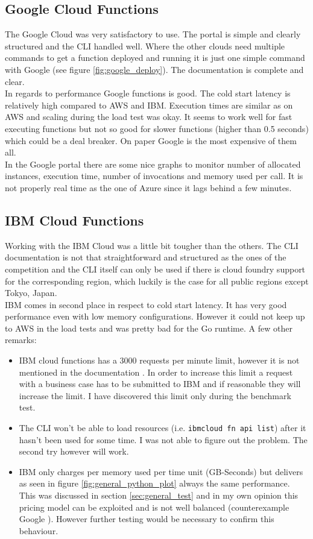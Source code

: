 \subsection*{Google Cloud Functions}
The Google Cloud was very satisfactory to use. The portal is simple and clearly structured and the \gls{CLI} handled well. Where the other clouds need multiple commands to get a function deployed and running it is just one simple command with Google (see figure \ref{fig:google_deploy}). The documentation is complete and clear.\\
In regards to performance Google functions is good. The cold start latency is relatively high compared to \gls{AWS} and \gls{IBM}. Execution times are similar as on \gls{AWS} and scaling during the load test was okay. It seems to work well for fast executing functions but not so good for slower functions (higher than 0.5 seconds) which could be a deal breaker. On paper Google is the most expensive of them all.\\
In the Google portal there are some nice graphs to monitor number of allocated instances, execution time, number of invocations and memory used per call. It is not properly real time as the one of Azure since it lags behind a few minutes.
\subsection*{IBM Cloud Functions}
Working with the \gls{IBM} Cloud was a little bit tougher than the others. The \gls{CLI} documentation is not that straightforward and structured as the ones of the competition and the \gls{CLI} itself can only be used if there is cloud foundry support for the corresponding region, which luckily is the case for all public regions except Tokyo, Japan.\\
\gls{IBM} comes in second place in respect to cold start latency. It has very good performance even with low memory configurations. However it could not keep up to \gls{AWS} in the load tests and was pretty bad for the Go runtime. A few other remarks:
\begin{itemize}
    \item \gls{IBM} cloud functions has a 3000 requests per minute limit, however it is not mentioned in the documentation \cite{IBMLimits}. In order to increase this limit a request with a business case has to be submitted to \gls{IBM} and if reasonable they will increase the limit. I have discovered this limit only during the benchmark test.
    \item The \gls{CLI} won't be able to load resources (i.e. \texttt{ibmcloud fn api list}) after it hasn't been used for some time. I was not able to figure out the problem. The second try however will work.
    \item IBM only charges per memory used per time unit (GB-Seconds) but delivers as seen in figure \ref{fig:general_python_plot} always the same performance. This was discussed in section \ref{sec:general_test} and in my own opinion this pricing model can be exploited and is not well balanced (counterexample Google \cite{IBMPricing, GoogleFunctionsPricing}). However further testing would be necessary to confirm this behaviour.
\end{itemize}

